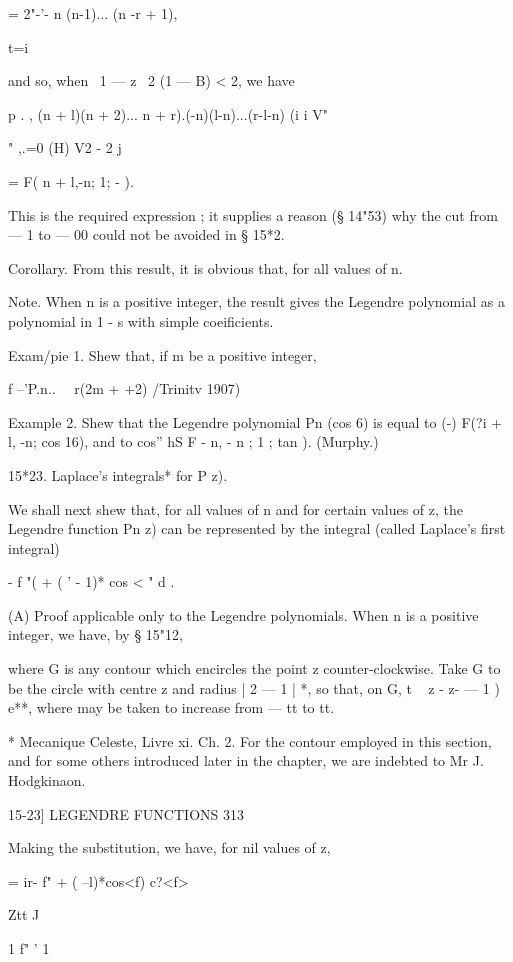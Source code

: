 {{= 2"-'- n (n-1)... (n -r + 1),

t=i

and so, when \ 1 — z \ 2 (1 — B) < 2, we have

p . , (n + l)(n + 2)... n + r).(-n)(l-n)...(r-l-n) (i i V"

   " ,.=0 (H) V2 - 2 j

= F( n + l,-n; 1; - ).

This is the required expression ; it supplies a reason (§ 14"53) why
the cut from — 1 to — 00 could not be avoided in § 15*2.

Corollary. From this result, it is obvious that, for all values of n.

Note. When n is a positive integer, the result gives the Legendre
polynomial as a polynomial in 1 - s with simple coeificients.

Exam/pie 1. Shew that, if m be a positive integer,

f --'P.n.. \ \ r(2m + +2) /Trinitv 1907)

Example 2. Shew that the Legendre polynomial Pn (cos 6) is equal to
(-) F(?i + l, -n; \; cos 16), and to cos'' hS F - n, - n ; 1 ; tan ).
(Murphy.)

15*23. Laplace's integrals* for P z).

We shall next shew that, for all values of n and for certain values of
z, the Legendre function Pn z) can be represented by the integral
(called Laplace's first integral)

- f "( + ( ' - 1)* cos < " d .

(A) Proof applicable only to the Legendre polynomials. When n is a
positive integer, we have, by § 15"12,

where G is any contour which encircles the point z counter-clockwise.
Take G to be the circle with centre z and radius | 2 — 1 | *, so that,
on G, t ~ z - z- — 1 ) e**, where may be taken to increase from — tt
to tt.

* Mecanique Celeste, Livre xi. Ch. 2. For the contour employed in this
section, and for some others introduced later in the chapter, we are
indebted to Mr J. Hodgkinaon.



15-23] LEGENDRE FUNCTIONS 313

Making the substitution, we have, for nil values of z,



= ir- f" + ( --l)*cos<f) c?<f>

Ztt J \

1 f" ' 1

}}
